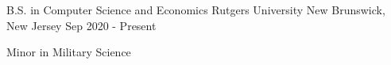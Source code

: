 

\begin{cventries}

  \cventry
    {B.S.  in Computer Science and Economics} %
    {Rutgers University} %
    {New Brunswick,  New Jersey} %
    {Sep 2020 - Present} %
    {
      \begin{cvitems} %
        \item {Minor in Military Science}
      \end{cvitems}
    }

\end{cventries}
